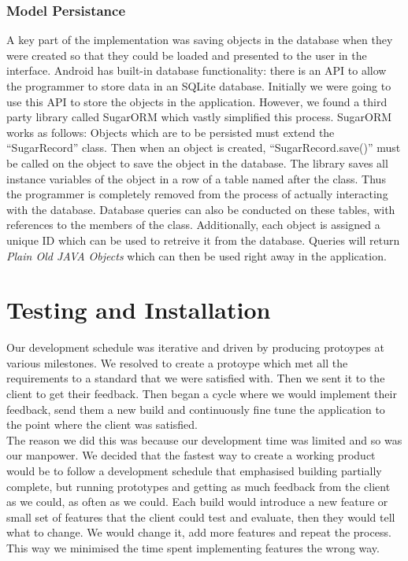 \documentclass[12pt]{article}
\begin{document}
\subsubsection{Model Persistance}
A key part of the implementation was saving objects in the database when they were created so that they could be loaded and presented to the user in the interface. Android has built-in database functionality: there is an API to allow the programmer to store data in an SQLite database. Initially we were going to use this API to store the objects in the application. However, we found a third party library called SugarORM which vastly simplified this process. SugarORM works as follows: Objects which are to be persisted must extend the ``SugarRecord'' class. Then when an object is created, ``SugarRecord.save()'' must be called on the object to save the object in the database. The library saves all instance variables of the object in a row of a table named after the class. Thus the programmer is completely removed from the process of actually interacting with the database. Database queries can also be conducted on these tables, with references to the members of the class. Additionally, each object is assigned a unique ID which can be used to retreive it from the database. Queries will return \textit{Plain Old JAVA Objects} which can then be used right away in the application.

\section{Testing and Installation}
Our development schedule was iterative and driven by producing protoypes at various milestones. We resolved to create a protoype which met all the requirements to a standard that we were satisfied with. Then we sent it to the client to get their feedback. Then began a cycle where we would implement their feedback, send them a new build and continuously fine tune the application to the point where the client was satisfied. \\

The reason we did this was because our development time was limited and so was our manpower. We decided that the fastest way to create a working product would be to follow a development schedule that emphasised building partially complete, but running prototypes and getting as much feedback from the client as we could, as often as we could. Each build would introduce a new feature or small set of features that the client could test and evaluate, then they would tell what to change. We would change it, add more features and repeat the process. This way we minimised the time spent implementing features the wrong way. \\
\end{document}
